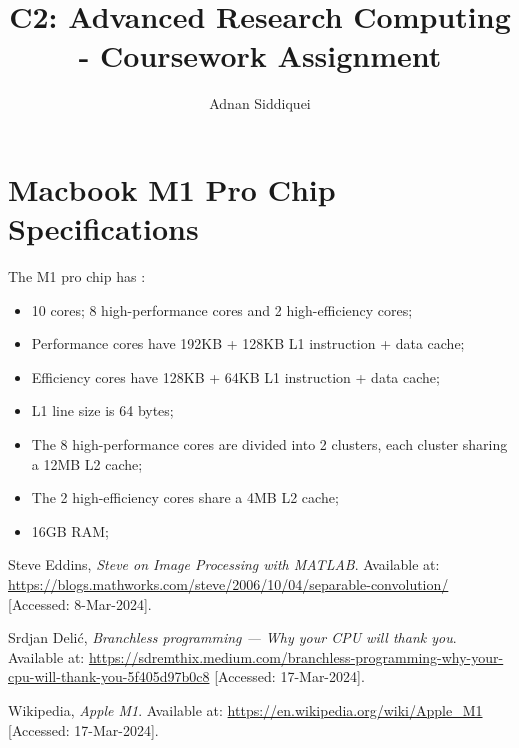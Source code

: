 \documentclass[a4paper,11pt]{article}
\title{\boldmath C2: Advanced Research Computing - Coursework Assignment}
\author{Adnan Siddiquei}
\affiliation{University of Cambridge}
\begin{document}
\maketitle
\flushbottom








\clearpage
\appendix

\section{Macbook M1 Pro Chip Specifications}\label{app:macbook-specs}
The M1 pro chip has \cite{apple-m1}:
\begin{itemize}
    \item 10 cores; 8 high-performance cores and 2 high-efficiency cores;
    \item Performance cores have 192KB + 128KB L1 instruction + data cache;
    \item Efficiency cores have 128KB + 64KB L1 instruction + data cache;
    \item L1 line size is 64 bytes;
    \item The 8 high-performance cores are divided into 2 clusters, each cluster sharing a 12MB L2 cache;
    \item The 2 high-efficiency cores share a 4MB L2 cache;
    \item 16GB RAM;
\end{itemize}



\begin{thebibliography}{99}

Steve Eddins,
\textit{Steve on Image Processing with MATLAB}.
Available at: \url{https://blogs.mathworks.com/steve/2006/10/04/separable-convolution/}
[Accessed: 8-Mar-2024].

Srdjan Delić,
\textit{Branchless programming — Why your CPU will thank you}.
Available at: \url{https://sdremthix.medium.com/branchless-programming-why-your-cpu-will-thank-you-5f405d97b0c8}
[Accessed: 17-Mar-2024].

Wikipedia,
\textit{Apple M1}.
Available at: \url{https://en.wikipedia.org/wiki/Apple_M1}
[Accessed: 17-Mar-2024].



\end{thebibliography}
\end{document}
